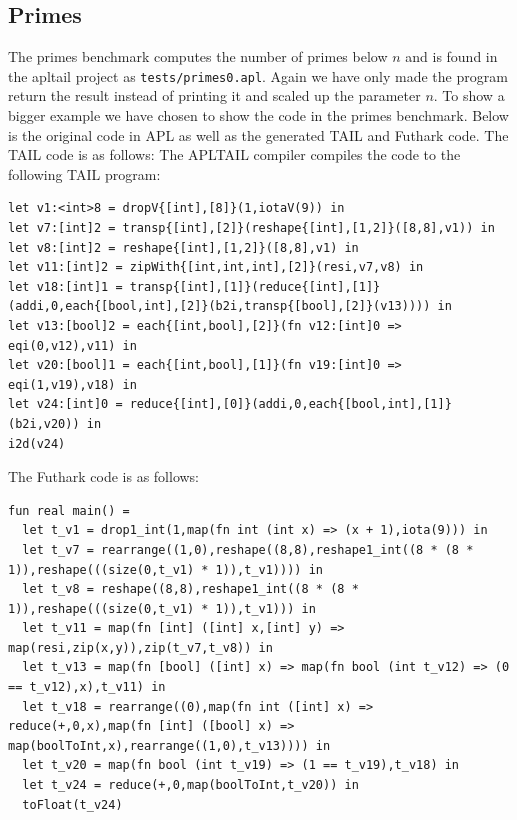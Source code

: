 \documentclass[11pt]{article}
\begin{document}
\subsection{Primes}
The primes benchmark computes the number of primes below $n$ and is found in the apltail project as {\tt tests/primes0.apl}.
Again we have only made the program return the result instead of printing it and scaled up the parameter $n$.
To show a bigger example we have chosen to show the code in the primes benchmark. Below is the original code in APL as well as the generated TAIL and Futhark code.
The TAIL code is as follows:
The APLTAIL compiler compiles the code to the following TAIL program:
\begin{lstlisting}[breaklines=true,language=TAIL]
let v1:<int>8 = dropV{[int],[8]}(1,iotaV(9)) in
let v7:[int]2 = transp{[int],[2]}(reshape{[int],[1,2]}([8,8],v1)) in
let v8:[int]2 = reshape{[int],[1,2]}([8,8],v1) in
let v11:[int]2 = zipWith{[int,int,int],[2]}(resi,v7,v8) in
let v18:[int]1 = transp{[int],[1]}(reduce{[int],[1]}(addi,0,each{[bool,int],[2]}(b2i,transp{[bool],[2]}(v13)))) in
let v13:[bool]2 = each{[int,bool],[2]}(fn v12:[int]0 => eqi(0,v12),v11) in
let v20:[bool]1 = each{[int,bool],[1]}(fn v19:[int]0 => eqi(1,v19),v18) in
let v24:[int]0 = reduce{[int],[0]}(addi,0,each{[bool,int],[1]}(b2i,v20)) in
i2d(v24)
\end{lstlisting}

The Futhark code is as follows:
\begin{lstlisting}[language=Futhark,breaklines=true]
fun real main() =
  let t_v1 = drop1_int(1,map(fn int (int x) => (x + 1),iota(9))) in
  let t_v7 = rearrange((1,0),reshape((8,8),reshape1_int((8 * (8 * 1)),reshape(((size(0,t_v1) * 1)),t_v1)))) in
  let t_v8 = reshape((8,8),reshape1_int((8 * (8 * 1)),reshape(((size(0,t_v1) * 1)),t_v1))) in
  let t_v11 = map(fn [int] ([int] x,[int] y) => map(resi,zip(x,y)),zip(t_v7,t_v8)) in
  let t_v13 = map(fn [bool] ([int] x) => map(fn bool (int t_v12) => (0 == t_v12),x),t_v11) in
  let t_v18 = rearrange((0),map(fn int ([int] x) => reduce(+,0,x),map(fn [int] ([bool] x) => map(boolToInt,x),rearrange((1,0),t_v13)))) in
  let t_v20 = map(fn bool (int t_v19) => (1 == t_v19),t_v18) in
  let t_v24 = reduce(+,0,map(boolToInt,t_v20)) in
  toFloat(t_v24)
\end{lstlisting}
\end{document}
